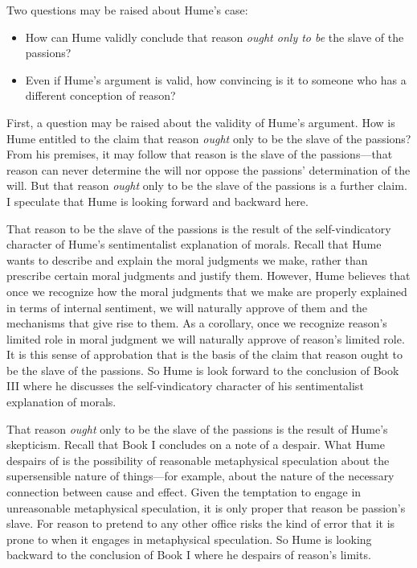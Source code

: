 Two questions may be raised about Hume's case:

\begin{itemize}
    \item How can Hume validly conclude that reason \emph{ought only to be} the slave of the passions?
    \item Even if Hume's argument is valid, how convincing is it to someone who has a different conception of reason?
\end{itemize}

First, a question may be raised about the validity of Hume's argument. How is Hume entitled to the claim that reason \emph{ought} only to be the slave of the passions? From his premises, it may follow that reason is the slave of the passions---that reason can never determine the will nor oppose the passions' determination of the will. But that reason \emph{ought} only to be the slave of the passions is a further claim. I speculate that Hume is looking forward and backward here.

That reason to be the slave of the passions is the result of the self-vindicatory character of Hume's sentimentalist explanation of morals. Recall that Hume wants to describe and explain the moral judgments we make, rather than prescribe certain moral judgments and justify them. However, Hume believes that once we recognize how the moral judgments that we make are properly explained in terms of internal sentiment, we will naturally approve of them and the mechanisms that give rise to them. As a corollary, once we recognize reason's limited role in moral judgment we will naturally approve of reason's limited role. It is this sense of approbation that is the basis of the claim that reason ought to be the slave of the passions. So Hume is look forward to the conclusion of Book III where he discusses the self-vindicatory character of his sentimentalist explanation of morals.

That reason \emph{ought} only to be the slave of the passions is the result of Hume's skepticism. Recall that Book I concludes on a note of a despair. What Hume despairs of is the possibility of reasonable metaphysical speculation about the supersensible nature of things---for example, about the nature of the necessary connection between cause and effect. Given the temptation to engage in unreasonable metaphysical speculation, it is only proper that reason be passion's slave. For reason to pretend to any other office risks the kind of error that it is prone to when it engages in metaphysical speculation. So Hume is looking backward to the conclusion of Book I where he despairs of reason's limits.

